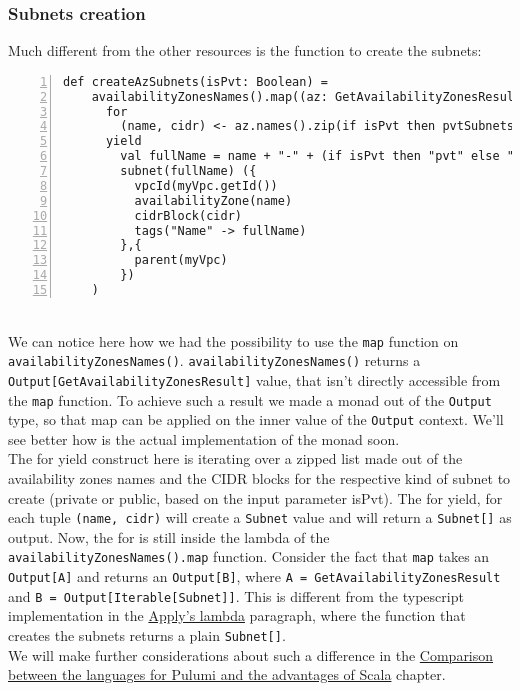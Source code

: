 \subsubsection{Subnets creation}
\label{sssec:subnets-creation}
Much different from the other resources is the function to create the subnets:
\begin{lstlisting}[numbers=left, numberstyle=\tiny, numbersep=-5pt, stepnumber=1,linewidth=420pt]
  def createAzSubnets(isPvt: Boolean) =
    availabilityZonesNames().map((az: GetAvailabilityZonesResult) =>
      for
        (name, cidr) <- az.names().zip(if isPvt then pvtSubnetsCidrs else pubSubnetsCidrs)
      yield
        val fullName = name + "-" + (if isPvt then "pvt" else "pub") + "-subnet-scala"
        subnet(fullName) ({
          vpcId(myVpc.getId())
          availabilityZone(name)
          cidrBlock(cidr)
          tags("Name" -> fullName)
        },{
          parent(myVpc)
        })
    )
\end{lstlisting}\mbox{}\\
We can notice here how we had the possibility to use the \texttt{map} function on \texttt{availabilityZonesNames()}.
\texttt{availabilityZonesNames()} returns a \texttt{Output[GetAvailabilityZonesResult]} value, that isn't directly accessible from the \texttt{map} function.
To achieve such a result we made a monad out of the \texttt{Output} type, so that map can be applied on the inner value of the \texttt{Output} context.
We'll see better how is the actual implementation of the monad soon.\\
The for yield construct here is iterating over a zipped list made out of the availability zones names and the CIDR blocks for the respective kind of subnet to create (private or public, based on the input parameter isPvt).
The for yield, for each tuple \texttt{(name, cidr)} will create a \texttt{Subnet} value and will return a \texttt{Subnet[]} as output.
Now, the for is still inside the lambda of the \texttt{availabilityZonesNames().map} function.
Consider the fact that \texttt{map} takes an \texttt{Output[A]} and returns an \texttt{Output[B]}, where \texttt{A = GetAvailabilityZonesResult} and \texttt{B = Output[Iterable[Subnet]]}.
This is different from the typescript implementation in the \hyperref[par:ts-lambda]{Apply's lambda} paragraph, where the function that creates the subnets returns a plain \texttt{Subnet[]}.\\
We will make further considerations about such a difference in the \hyperref[cap:comparisons]{Comparison between the languages for Pulumi and the advantages of Scala} chapter.\\

